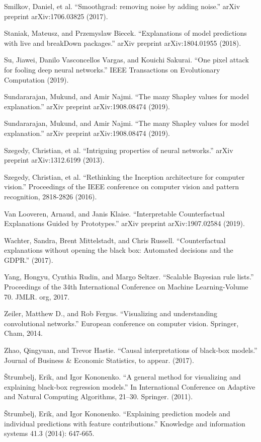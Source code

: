 \documentclass[12pt,]{krantz}
\begin{document}
Smilkov, Daniel, et al. ``Smoothgrad: removing noise by adding noise.''
arXiv preprint arXiv:1706.03825 (2017).

Staniak, Mateusz, and Przemyslaw Biecek. ``Explanations of model
predictions with live and breakDown packages.'' arXiv preprint
arXiv:1804.01955 (2018).

Su, Jiawei, Danilo Vasconcellos Vargas, and Kouichi Sakurai. ``One pixel
attack for fooling deep neural networks.'' IEEE Transactions on
Evolutionary Computation (2019).

Sundararajan, Mukund, and Amir Najmi. ``The many Shapley values for
model explanation.'' arXiv preprint arXiv:1908.08474 (2019).

Sundararajan, Mukund, and Amir Najmi. ``The many Shapley values for
model explanation.'' arXiv preprint arXiv:1908.08474 (2019).

Szegedy, Christian, et al. ``Intriguing properties of neural networks.''
arXiv preprint arXiv:1312.6199 (2013).

Szegedy, Christian, et al. ``Rethinking the Inception architecture for
computer vision.'' Proceedings of the IEEE conference on computer vision
and pattern recognition, 2818-2826 (2016).

Van Looveren, Arnaud, and Janis Klaise. ``Interpretable Counterfactual
Explanations Guided by Prototypes.'' arXiv preprint arXiv:1907.02584
(2019).

Wachter, Sandra, Brent Mittelstadt, and Chris Russell. ``Counterfactual
explanations without opening the black box: Automated decisions and the
GDPR.'' (2017).

Yang, Hongyu, Cynthia Rudin, and Margo Seltzer. ``Scalable Bayesian rule
lists.'' Proceedings of the 34th International Conference on Machine
Learning-Volume 70. JMLR. org, 2017.

Zeiler, Matthew D., and Rob Fergus. ``Visualizing and understanding
convolutional networks.'' European conference on computer vision.
Springer, Cham, 2014.

Zhao, Qingyuan, and Trevor Hastie. ``Causal interpretations of black-box
models.'' Journal of Business \& Economic Statistics, to appear. (2017).

Štrumbelj, Erik, and Igor Kononenko. ``A general method for visualizing
and explaining black-box regression models.'' In International
Conference on Adaptive and Natural Computing Algorithms, 21--30.
Springer. (2011).

Štrumbelj, Erik, and Igor Kononenko. ``Explaining prediction models and
individual predictions with feature contributions.'' Knowledge and
information systems 41.3 (2014): 647-665.
\end{document}
